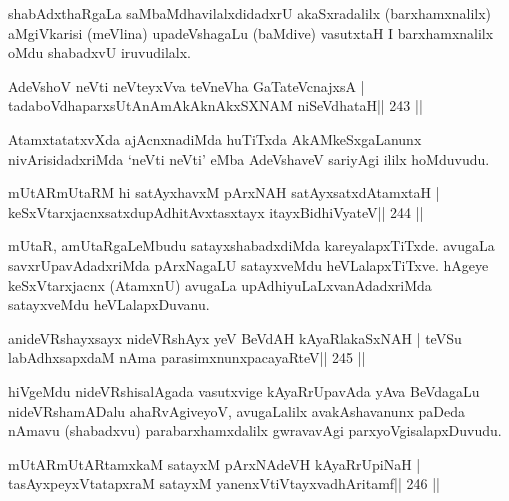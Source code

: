 \begin{artha}
shabAdxthaRgaLa saMbaMdhavilalxdidadxrU akaSxradalilx (barxhamxnalilx) aMgiVkarisi (meVlina) upadeVshagaLu (baMdive) vasutxtaH I barxhamxnalilx oMdu shabadxvU iruvudilalx.
\end{artha}


\begin{shl}
AdeVshoV neVti neVteyxVva teVneVha GaTateV\s cnajxsA |
tadaboVdhaparxsUtAnAmAkAknAkxSXNAM niSeVdhataH\hfill || 243 ||
\end{shl}

\begin{artha}
AtamxtatatxvXda ajAcnxnadiMda huTiTxda AkAMkeSxgaLanunx nivArisidadxriMda `neVti neVti' eMba AdeVshaveV sariyAgi ililx hoMduvudu.
\end{artha}


\begin{shl}
mUtARmUtaRM hi satAyxhavxM pArxNAH satAyxsatxdAtamxtaH | 
keSxVtarxjacnxsatxdupAdhitAvxtasxtayx itayxBidhiVyateV\hfill || 244 ||
\end{shl}

\begin{artha}
mUtaR, amUtaRgaLeMbudu satayxshabadxdiMda kareyalapxTiTxde. avugaLa savxrUpavAdadxriMda pArxNagaLU satayxveMdu heVLalapxTiTxve. hAgeye keSxVtarxjacnx (AtamxnU) avugaLa upAdhiyuLaLxvanAdadxriMda satayxveMdu heVLalapxDuvanu.
\end{artha}

\begin{shl}
anideVRshayxsayx nideVRshAyx yeV BeVdAH kAyaRlakaSxNAH |
teVSu labAdhxsapxdaM nAma parasimxnunxpacayaRteV\hfill || 245 ||
\end{shl}

\begin{artha}
hiVgeMdu nideVRshisalAgada vasutxvige kAyaRrUpavAda yAva BeVdagaLu nideVRshamADalu ahaRvAgiveyoV, avugaLalilx avakAshavanunx paDeda nAmavu (shabadxvu) parabarxhamxdalilx gwravavAgi parxyoVgisalapxDuvudu.
\end{artha}

\begin{shl}
mUtARmUtARtamxkaM satayxM pArxNAdeVH kAyaRrUpiNaH |
tasAyxpeyxVtatapxraM satayxM yanenxVtiVtayxvadhAritamf\hfill || 246 ||
\end{shl}

